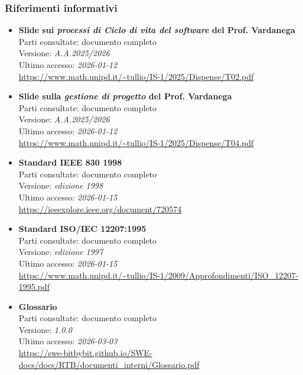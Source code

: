 \documentclass[a4paper,12pt]{article}
\begin{document}
\subsubsection{Riferimenti informativi} \label{sec:riferimenti_informativi}
\begin{itemize}
    \item \textbf{Slide sui \emph{processi di Ciclo di vita del software} del Prof. Vardanega}\\
        Parti consultate: documento completo\\
        Versione: \textit{A.A.2025/2026}\\
        Ultimo accesso: \textit{2026-01-12}\\
        \url{https://www.math.unipd.it/~tullio/IS-1/2025/Dispense/T02.pdf}
    \item \textbf{Slide sulla \emph{gestione di progetto} del Prof. Vardanega}\\
        Parti consultate: documento completo\\
        Versione: \textit{A.A.2025/2026}\\
        Ultimo accesso: \textit{2026-01-12}\\
        \url{https://www.math.unipd.it/~tullio/IS-1/2025/Dispense/T04.pdf}
    \item \textbf{Standard IEEE 830 1998}\\
        Parti consultate: documento completo\\
        Versione: \textit{edizione 1998}\\
        Ultimo accesso: \textit{2026-01-15}\\
        \url{https://ieeexplore.ieee.org/document/720574}
    \item \textbf{Standard ISO/IEC 12207:1995}\\
        Parti consultate: documento completo\\
        Versione: \textit{edizione 1997} \\
        Ultimo accesso: \textit{2026-01-15}\\
        \url{https://www.math.unipd.it/~tullio/IS-1/2009/Approfondimenti/ISO_12207-1995.pdf}
    \item \textbf{Glossario}\\
        Parti consultate: documento completo\\
        Versione: \textit{1.0.0}\\
        Ultimo accesso: \textit{2026-03-03}\\
        \url{https://swe-bitbybit.github.io/SWE-docs/docs/RTB/documenti_interni/Glossario.pdf}
\end{itemize}
\end{document}
